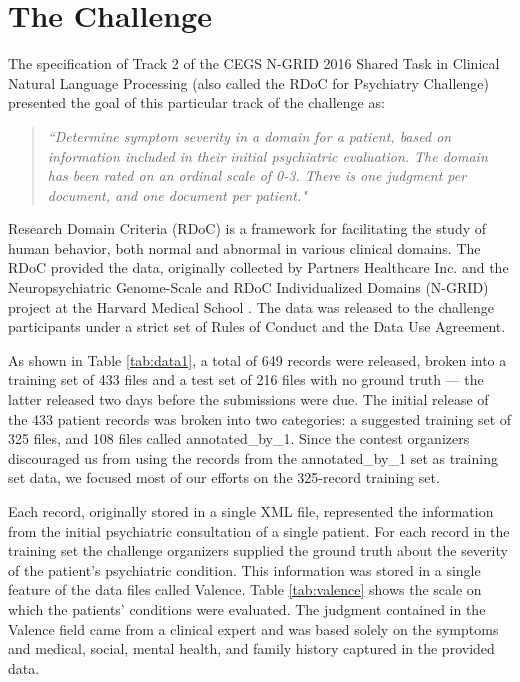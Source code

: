 \chapter{The Challenge}\label{sec:challenge}

The specification of Track 2 of the CEGS N-GRID 2016 Shared Task in Clinical Natural Language Processing  (also called the RDoC for Psychiatry Challenge) presented 
the goal of this particular track of the challenge as:
\begin{quote}
\textsl{``Determine symptom severity in a domain for a patient, based on information included in their initial psychiatric evaluation. The domain has been rated on an ordinal scale of 0-3. There is one judgment per document, and one document per patient."}\cite{N-GRID}
\end{quote}

Research Domain Criteria (RDoC) is a framework for facilitating the study of human behavior,
both normal and abnormal in various clinical domains. The RDoC provided the data,
originally collected by Partners Healthcare Inc. and the Neuropsychiatric Genome-Scale and RDoC
Individualized Domains (N-GRID) project at the Harvard Medical School \cite{N-GRID}.  The data
was released to the challenge participants under a strict set of Rules of Conduct and the Data Use Agreement.

As shown in Table \ref{tab:data1}, a total of 649 records were released,  broken into a training set of 433 files and 
a test set of 216 files with no ground truth --- the latter released two days before
the submissions were due. The initial release of the 433 patient records was broken into two categories: a suggested training set of 325 files, and 108 files
called \textsf{annotated\_by\_1}. Since the contest organizers discouraged us from using the records from the \textsf{annotated\_by\_1} set as training set data, we focused 
most of our efforts on the 325-record training set.

Each record, originally stored in a single XML file, represented the information from the
initial psychiatric consultation of a single patient. For each record in the training set the challenge organizers supplied the ground truth
about the severity of the patient's psychiatric condition. This information was stored in
a single feature of the data files called \textsf{Valence}.  Table \ref{tab:valence} shows the
scale on which the patients' conditions were evaluated.  The judgment contained in the \textsf{Valence}
field came from a clinical expert and was based solely on the symptoms and medical, social, 
mental health, and family history captured in the provided data.

